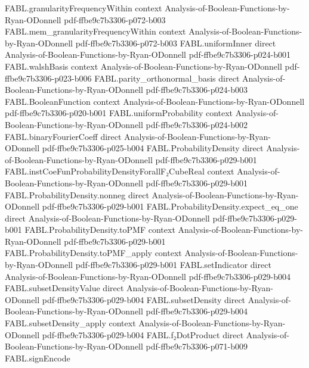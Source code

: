 \begin{theorem}
\proofstep
  {FABL.granularityFrequencyWithin}
  {context}
  {Analysis-of-Boolean-Functions-by-Ryan-ODonnell}
  {pdf-ffbe9c7b3306-p072-b003}
\proofstep
  {FABL.mem_granularityFrequencyWithin}
  {context}
  {Analysis-of-Boolean-Functions-by-Ryan-ODonnell}
  {pdf-ffbe9c7b3306-p072-b003}
\proofstep
  {FABL.uniformInner}
  {direct}
  {Analysis-of-Boolean-Functions-by-Ryan-ODonnell}
  {pdf-ffbe9c7b3306-p024-b001}
\proofstep
  {FABL.walshBasis}
  {context}
  {Analysis-of-Boolean-Functions-by-Ryan-ODonnell}
  {pdf-ffbe9c7b3306-p023-b006}
\proofstep
  {FABL.parity_orthonormal_basis}
  {direct}
  {Analysis-of-Boolean-Functions-by-Ryan-ODonnell}
  {pdf-ffbe9c7b3306-p024-b003}
\proofstep
  {FABL.BooleanFunction}
  {context}
  {Analysis-of-Boolean-Functions-by-Ryan-ODonnell}
  {pdf-ffbe9c7b3306-p020-b001}
\proofstep
  {FABL.uniformProbability}
  {context}
  {Analysis-of-Boolean-Functions-by-Ryan-ODonnell}
  {pdf-ffbe9c7b3306-p024-b002}
\proofstep
  {FABL.binaryFourierCoeff}
  {direct}
  {Analysis-of-Boolean-Functions-by-Ryan-ODonnell}
  {pdf-ffbe9c7b3306-p025-b004}
\proofstep
  {FABL.ProbabilityDensity}
  {direct}
  {Analysis-of-Boolean-Functions-by-Ryan-ODonnell}
  {pdf-ffbe9c7b3306-p029-b001}
\proofstep
  {FABL.instCoeFunProbabilityDensityForallF₂CubeReal}
  {context}
  {Analysis-of-Boolean-Functions-by-Ryan-ODonnell}
  {pdf-ffbe9c7b3306-p029-b001}
\proofstep
  {FABL.ProbabilityDensity.nonneg}
  {direct}
  {Analysis-of-Boolean-Functions-by-Ryan-ODonnell}
  {pdf-ffbe9c7b3306-p029-b001}
\proofstep
  {FABL.ProbabilityDensity.expect_eq_one}
  {direct}
  {Analysis-of-Boolean-Functions-by-Ryan-ODonnell}
  {pdf-ffbe9c7b3306-p029-b001}
\proofstep
  {FABL.ProbabilityDensity.toPMF}
  {context}
  {Analysis-of-Boolean-Functions-by-Ryan-ODonnell}
  {pdf-ffbe9c7b3306-p029-b001}
\proofstep
  {FABL.ProbabilityDensity.toPMF_apply}
  {context}
  {Analysis-of-Boolean-Functions-by-Ryan-ODonnell}
  {pdf-ffbe9c7b3306-p029-b001}
\proofstep
  {FABL.setIndicator}
  {direct}
  {Analysis-of-Boolean-Functions-by-Ryan-ODonnell}
  {pdf-ffbe9c7b3306-p029-b004}
\proofstep
  {FABL.subsetDensityValue}
  {direct}
  {Analysis-of-Boolean-Functions-by-Ryan-ODonnell}
  {pdf-ffbe9c7b3306-p029-b004}
\proofstep
  {FABL.subsetDensity}
  {direct}
  {Analysis-of-Boolean-Functions-by-Ryan-ODonnell}
  {pdf-ffbe9c7b3306-p029-b004}
\proofstep
  {FABL.subsetDensity_apply}
  {context}
  {Analysis-of-Boolean-Functions-by-Ryan-ODonnell}
  {pdf-ffbe9c7b3306-p029-b004}
\proofstep
  {FABL.f₂DotProduct}
  {direct}
  {Analysis-of-Boolean-Functions-by-Ryan-ODonnell}
  {pdf-ffbe9c7b3306-p071-b009}
\proofstep
  {FABL.signEncode}

\end{theorem}
